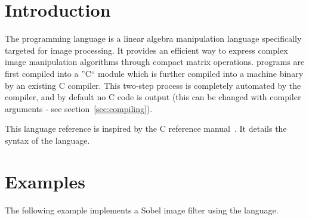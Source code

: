 \newcommand{\startsyn}{\begin{center}\begin{tabular}{l}}
\newcommand{\stopsyn}{\end{tabular}\end{center}}

\section{Introduction}
The \sys{} programming language is a linear algebra manipulation language
specifically targeted for image processing. It provides an efficient way to
express complex image manipulation algorithms through compact matrix
operations. \sys{} programs are first compiled into a ''C`` module which is
further compiled into a machine binary by an existing C compiler. This two-step
process is completely automated by the \sys{} compiler, and by default no C code
is output (this can be changed with compiler arguments - see section~\ref{sec:compiling}).

This language reference is inspired by the C reference manual~\cite{DBLP:KernighanR88}.
It details the syntax of the \sys{} language.









\clearpage
\section{Examples}
The following example implements a Sobel image filter using the
\sys{} language.

